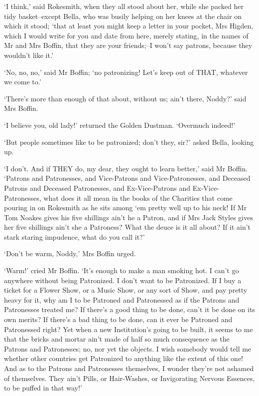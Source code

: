 ‘I think,’ said Rokesmith, when they all stood about her, while she
packed her tidy basket--except Bella, who was busily helping on her
knees at the chair on which it stood; ‘that at least you might keep a
letter in your pocket, Mrs Higden, which I would write for you and date
from here, merely stating, in the names of Mr and Mrs Boffin, that they
are your friends;--I won’t say patrons, because they wouldn’t like it.’

‘No, no, no,’ said Mr Boffin; ‘no patronizing! Let’s keep out of THAT,
whatever we come to.’

‘There’s more than enough of that about, without us; ain’t there,
Noddy?’ said Mrs Boffin.

‘I believe you, old lady!’ returned the Golden Dustman. ‘Overmuch
indeed!’

‘But people sometimes like to be patronized; don’t they, sir?’ asked
Bella, looking up.

‘I don’t. And if THEY do, my dear, they ought to learn better,’ said Mr
Boffin. ‘Patrons and Patronesses, and Vice-Patrons and Vice-Patronesses,
and Deceased Patrons and Deceased Patronesses, and Ex-Vice-Patrons and
Ex-Vice-Patronesses, what does it all mean in the books of the Charities
that come pouring in on Rokesmith as he sits among ‘em pretty well up to
his neck! If Mr Tom Noakes gives his five shillings ain’t he a Patron,
and if Mrs Jack Styles gives her five shillings ain’t she a Patroness?
What the deuce is it all about? If it ain’t stark staring impudence,
what do you call it?’

‘Don’t be warm, Noddy,’ Mrs Boffin urged.

‘Warm!’ cried Mr Boffin. ‘It’s enough to make a man smoking hot. I can’t
go anywhere without being Patronized. I don’t want to be Patronized. If
I buy a ticket for a Flower Show, or a Music Show, or any sort of Show,
and pay pretty heavy for it, why am I to be Patroned and Patronessed as
if the Patrons and Patronesses treated me? If there’s a good thing to be
done, can’t it be done on its own merits? If there’s a bad thing to
be done, can it ever be Patroned and Patronessed right? Yet when a new
Institution’s going to be built, it seems to me that the bricks and
mortar ain’t made of half so much consequence as the Patrons and
Patronesses; no, nor yet the objects. I wish somebody would tell me
whether other countries get Patronized to anything like the extent of
this one! And as to the Patrons and Patronesses themselves, I wonder
they’re not ashamed of themselves. They ain’t Pills, or Hair-Washes, or
Invigorating Nervous Essences, to be puffed in that way!’

